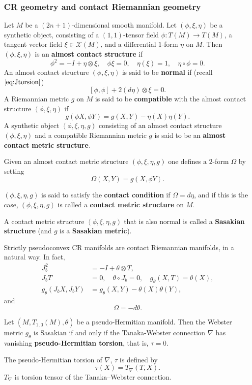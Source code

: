 \subsubsection{CR geometry and contact Riemannian geometry}
Let $M$ be a $(2n+1)$-dimensional smooth manifold. Let $(\phi,\xi,\eta)$
be a synthetic object, consisting of a $(1, 1)$-tensor ﬁeld $\phi: T (M) \to T (M)$, a tangent
vector ﬁeld $\xi \in \mathcal{X}(M)$, and a differential $1$-form $\eta$ on $M$. Then $(\phi,\xi,\eta)$ is an \textbf{almost contact structure} if
$$
\phi^{2}=-I+\eta \otimes \xi, \quad \phi \xi=0, \quad \eta(\xi)=1, \quad \eta \circ \phi=0 .
$$
An almost contact structure $(\phi,\xi,\eta)$ is said to be \textbf{normal} if (recall $ \eqref{eq:Jtorsion} $)
$$
[\phi, \phi]+2(d \eta) \otimes \xi=0.
$$
A Riemannian metric $g$ on $M$ is said to be \textbf{compatible} with the almost contact structure $(\phi,\xi,\eta)$ if
$$
g(\phi X, \phi Y)=g(X, Y)-\eta(X) \eta(Y).
$$
A synthetic object $(\phi,\xi,\eta,g)$ consisting of an almost contact
structure $(\phi,\xi,\eta)$ and a compatible Riemannian metric $g$ is said to be an \textbf{almost contact metric structure}. 

Given an almost contact metric structure $(\phi,\xi,\eta,g)$ one deﬁnes
a $2$-form $\Omega$ by setting $$\Omega(X, Y ) = g(X, \phi Y ).$$  

$(\phi,\xi,\eta,g)$ is said to satisfy the \textbf{contact condition }if $\Omega = d\eta$, and if this is the case, $(\phi,\xi,\eta,g)$ is called a \textbf{contact metric structure }on $M$. 

A contact metric structure $(\phi,\xi,\eta,g)$ that is also normal is called a \textbf{Sasakian structure} (and $g$ is a \textbf{Sasakian metric}).

\begin{example}
    Strictly pseudoconvex CR manifolds are contact Riemannian manifolds, in a natural way.
    In fact,
    $$
\begin{aligned}
J_{b}^{2} & =-I+\theta \otimes T, \\
J_{b} T & =0, \quad \theta \circ J_{b}=0, \quad g_{\theta}(X, T)=\theta(X), \\
g_{\theta}\left(J_{b} X, J_{b} Y\right) & =g_{\theta}(X, Y)-\theta(X) \theta(Y),
\end{aligned}
$$
and
$$\Omega=-d\theta.$$
\end{example}

\begin{theorem}
    Let $(M, T_{1,0} (M), \theta)$ be a pseudo-Hermitian manifold. Then the Webster metric $g_{\theta}$ is Sasakian if and only if the Tanaka-Webster connection $\nabla$ has vanishing \textbf{pseudo-Hermitian torsion}, that is, $\tau=0.$ 
\end{theorem}
\begin{remark}
    The pseudo-Hermitian torsion of $\nabla $,  $\tau$ is defined by 
    $$\boxed{\tau(X)=T_{\nabla}(T,X).}$$ 
    $T_{\nabla}$ is torsion tensor of the Tanaka–Webster connection.
\end{remark}

